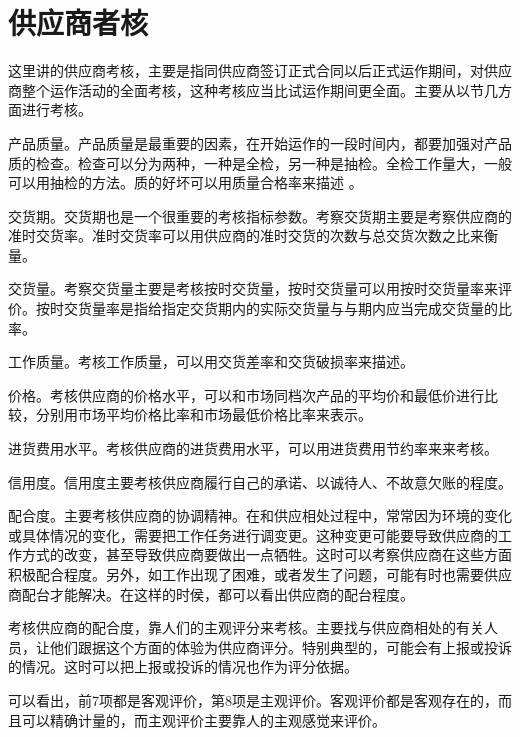\section {供应商者核}

    这里讲的供应商考核，主要是指同供应商签订正式合同以后正式运作期间，对供应商整个运作活动的全面考核，这种考核应当比试运作期间更全面。主要从以节几方面进行考核。

    \begin{enumerate.zh}

        \item 产品质量。产品质量是最重要的因素，在开始运作的一段时间内，都要加强对产品质的检查。检查可以分为两种，一种是全检，另一种是抽检。全检工作量大，一般可以用抽检的方法。质的好坏可以用质量合格率来描述 。

        \item 交货期。交货期也是一个很重要的考核指标参数。考察交货期主要是考察供应商的准时交货率。准时交货率可以用供应商的准时交货的次数与总交货次数之比来衡量。

        \item 交货量。考察交货量主要是考核按时交货量，按时交货量可以用按时交货量率来评价。按时交货量率是指给指定交货期内的实际交货量与与期内应当完成交货量的比率。

        \item 工作质量。考核工作质量，可以用交货差率和交货破损率来描述。

        \item 价格。考核供应商的价格水平，可以和市场同档次产品的平均价和最低价进行比较，分别用市场平均价格比率和市场最低价格比率来表示。

        \item 进货费用水平。考核供应商的进货费用水平，可以用进货费用节约率来来考核。

        \item 信用度。信用度主要考核供应商履行自己的承诺、以诚待人、不故意欠账的程度。

        \item 配合度。主要考核供应商的协调精神。在和供应相处过程中，常常因为环境的变化或具体情况的变化，需要把工作任务进行调变更。这种变更可能要导致供应商的工作方式的改变，甚至导致供应商要做出一点牺牲。这时可以考察供应商在这些方面积极配合程度。另外，如工作出现了困难，或者发生了问题，可能有时也需要供应商配台才能解决。在这样的时侯，都可以看出供应商的配台程度。

    \end{enumerate.zh}

    考核供应商的配合度，靠人们的主观评分来考核。主要找与供应商相处的有关人员，让他们跟据这个方面的体验为供应商评分。特别典型的，可能会有上报或投诉的情况。这时可以把上报或投诉的情况也作为评分依据。

    可以看出，前7项都是客观评价，第8项是主观评价。客观评价都是客观存在的，而且可以精确计量的，而主观评价主要靠人的主观感觉来评价。
